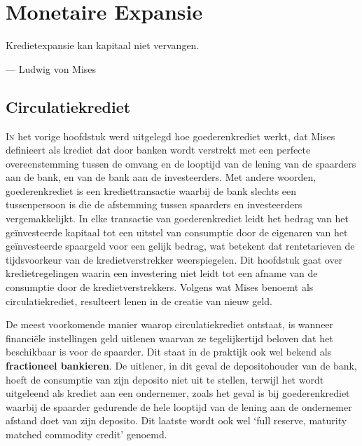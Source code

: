 \hypertarget{monetaire-expansie}{%
\chapter{Monetaire Expansie}\label{monetaire-expansie}}

\begin{blockquotebox}
    Kredietexpansie kan kapitaal niet vervangen.\footnotemark
    \par\raggedleft--- Ludwig von Mises
\end{blockquotebox}

\vspace{-1em}
\hypertarget{circulatiekrediet}{%
\section{Circulatiekrediet}\label{circulatiekrediet}}

\lettrine{I}n het vorige hoofdstuk werd uitgelegd hoe goederenkrediet werkt, dat Mises definieert als krediet dat door banken wordt verstrekt met een perfecte overeenstemming tussen de omvang en de looptijd van de lening van de spaarders aan de bank, en van de bank aan de investeerders. Met andere woorden, goederenkrediet is een krediettransactie waarbij de bank slechts een tussenpersoon is die de afstemming tussen spaarders en investeerders vergemakkelijkt. In elke transactie van goederenkrediet leidt het bedrag van het geïnvesteerde kapitaal tot een uitstel van consumptie door de eigenaren van het geïnvesteerde spaargeld voor een gelijk bedrag, wat betekent dat rentetarieven de tijdsvoorkeur van de kredietverstrekker weerspiegelen. Dit hoofdstuk gaat over kredietregelingen waarin een investering niet leidt tot een afname van de consumptie door de kredietverstrekkers. Volgens wat Mises benoemt als circulatiekrediet, resulteert lenen in de creatie van nieuw geld.

De meest voorkomende manier waarop circulatiekrediet ontstaat, is wanneer financiële instellingen geld uitlenen waarvan ze tegelijkertijd beloven dat het beschikbaar is voor de spaarder. Dit staat in de praktijk ook wel bekend als \textbf{fractioneel bankieren}. De uitlener, in dit geval de depositohouder van de bank, hoeft de consumptie van zijn deposito niet uit te stellen, terwijl het wordt uitgeleend als krediet aan een ondernemer, zoals het geval is bij goederenkrediet waarbij de spaarder gedurende de hele looptijd van de lening aan de ondernemer afstand doet van zijn deposito. Dit laatste wordt ook wel `full reserve, maturity matched commodity credit' genoemd.

